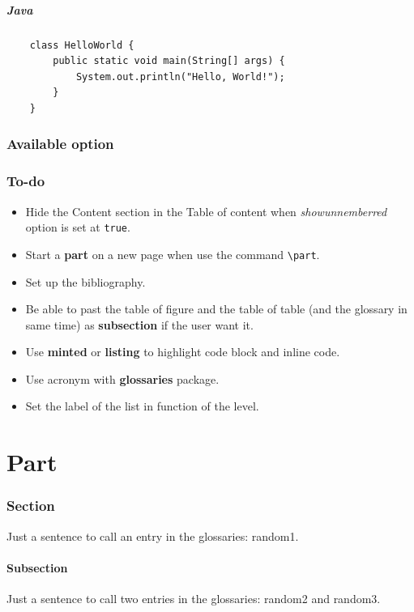 \documentclass[a4paper, 11pt]{article}
\begin{document}
\subsubsection{Java}
\begin{verbatim}
    class HelloWorld {
        public static void main(String[] args) {
            System.out.println("Hello, World!");
        }
    }
\end{verbatim}

\section{Available option}

\section{To-do}

\begin{itemize}
    \item Hide the Content section in the Table of content when \textit{showunnemberred} option is set at \verb=true=.
    \item Start a \textbf{part} on a new page when use the command \verb=\part=.
    \item Set up the bibliography.
    \item Be able to past the table of figure and the table of table (and the glossary in same time) as \textbf{subsection} if
          the user want it.
    \item Use \textbf{minted} or \textbf{listing} to highlight code block and inline code.
    \item Use acronym with \textbf{glossaries} package.
    \item Set the label of the list in function of the level.
\end{itemize}


\clearpage
\part*{Part}
\lipsum[1-3]
\section*{Section}
\lipsum[4-6]
Just a sentence to call an entry in the glossaries: \gls{random1}.
\subsection*{Subsection}
\lipsum[7-8]
Just a sentence to call two entries in the glossaries: \gls{random2} and \gls{random3}.
\end{document}

